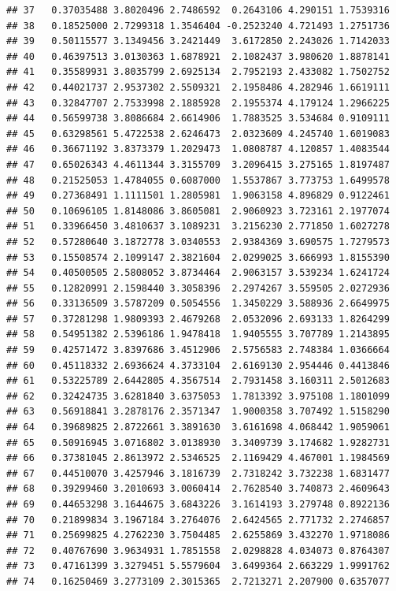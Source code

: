 \documentclass[
  11pt,
]{book}
\begin{document}
\begin{verbatim}
## 37   0.37035488 3.8020496 2.7486592  0.2643106 4.290151 1.7539316
## 38   0.18525000 2.7299318 1.3546404 -0.2523240 4.721493 1.2751736
## 39   0.50115577 3.1349456 3.2421449  3.6172850 2.243026 1.7142033
## 40   0.46397513 3.0130363 1.6878921  2.1082437 3.980620 1.8878141
## 41   0.35589931 3.8035799 2.6925134  2.7952193 2.433082 1.7502752
## 42   0.44021737 2.9537302 2.5509321  2.1958486 4.282946 1.6619111
## 43   0.32847707 2.7533998 2.1885928  2.1955374 4.179124 1.2966225
## 44   0.56599738 3.8086684 2.6614906  1.7883525 3.534684 0.9109111
## 45   0.63298561 5.4722538 2.6246473  2.0323609 4.245740 1.6019083
## 46   0.36671192 3.8373379 1.2029473  1.0808787 4.120857 1.4083544
## 47   0.65026343 4.4611344 3.3155709  3.2096415 3.275165 1.8197487
## 48   0.21525053 1.4784055 0.6087000  1.5537867 3.773753 1.6499578
## 49   0.27368491 1.1111501 1.2805981  1.9063158 4.896829 0.9122461
## 50   0.10696105 1.8148086 3.8605081  2.9060923 3.723161 2.1977074
## 51   0.33966450 3.4810637 3.1089231  3.2156230 2.771850 1.6027278
## 52   0.57280640 3.1872778 3.0340553  2.9384369 3.690575 1.7279573
## 53   0.15508574 2.1099147 2.3821604  2.0299025 3.666993 1.8155390
## 54   0.40500505 2.5808052 3.8734464  2.9063157 3.539234 1.6241724
## 55   0.12820991 2.1598440 3.3058396  2.2974267 3.559505 2.0272936
## 56   0.33136509 3.5787209 0.5054556  1.3450229 3.588936 2.6649975
## 57   0.37281298 1.9809393 2.4679268  2.0532096 2.693133 1.8264299
## 58   0.54951382 2.5396186 1.9478418  1.9405555 3.707789 1.2143895
## 59   0.42571472 3.8397686 3.4512906  2.5756583 2.748384 1.0366664
## 60   0.45118332 2.6936624 4.3733104  2.6169130 2.954446 0.4413846
## 61   0.53225789 2.6442805 4.3567514  2.7931458 3.160311 2.5012683
## 62   0.32424735 3.6281840 3.6375053  1.7813392 3.975108 1.1801099
## 63   0.56918841 3.2878176 2.3571347  1.9000358 3.707492 1.5158290
## 64   0.39689825 2.8722661 3.3891630  3.6161698 4.068442 1.9059061
## 65   0.50916945 3.0716802 3.0138930  3.3409739 3.174682 1.9282731
## 66   0.37381045 2.8613972 2.5346525  2.1169429 4.467001 1.1984569
## 67   0.44510070 3.4257946 3.1816739  2.7318242 3.732238 1.6831477
## 68   0.39299460 3.2010693 3.0060414  2.7628540 3.740873 2.4609643
## 69   0.44653298 3.1644675 3.6843226  3.1614193 3.279748 0.8922136
## 70   0.21899834 3.1967184 3.2764076  2.6424565 2.771732 2.2746857
## 71   0.25699825 4.2762230 3.7504485  2.6255869 3.432270 1.9718086
## 72   0.40767690 3.9634931 1.7851558  2.0298828 4.034073 0.8764307
## 73   0.47161399 3.3279451 5.5579604  3.6499364 2.663229 1.9991762
## 74   0.16250469 3.2773109 2.3015365  2.7213271 2.207900 0.6357077

\end{verbatim}
\end{document}
